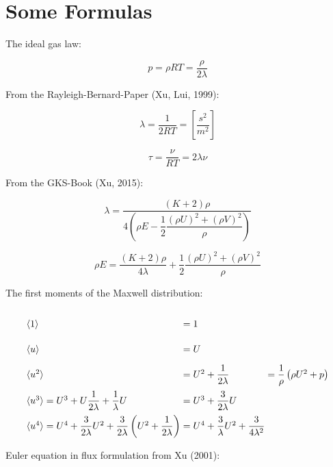 \documentclass[
	pdftex,             %
	12pt,				%
	a4paper,		   	%
	english,				%
	oneside,			%
]{article}
\newcommand{\mom}[1]{\langle #1 \rangle}
\begin{document}
\clearpage

\section{Some Formulas}

The ideal gas law:

\begin{equation}
p = \rho RT = \dfrac{\rho}{2 \lambda}
\end{equation}

From the Rayleigh-Bernard-Paper (Xu, Lui, 1999):

\begin{equation}
\lambda = \frac{1}{2RT} = \left[ \dfrac{s^2}{m^2} \right]
\end{equation}

\begin{equation}
\tau = \frac{\nu}{RT} = 2\lambda\nu
\end{equation}

From the GKS-Book (Xu, 2015):

\begin{equation}
\lambda =\frac{(K+2)\rho}
{4\left( \rho E - \dfrac{1}{2} \dfrac{(\rho U)^2 + (\rho V)^2}{\rho}  \right)}
\end{equation}

\begin{equation}
\rho E = \dfrac{(K+2)\rho}{4\lambda} + \dfrac{1}{2} \dfrac{(\rho U)^2 + (\rho V)^2}{\rho}
\end{equation}

The first moments of the Maxwell distribution:

\begin{equation}
\arraycolsep=1.4pt\def\arraystretch{2.2}
\begin{array}{lcll}
\mom{1} &=& 1 &\\
\mom{u} &=& U &\\
\mom{u^2} &=& U^2 + \dfrac{1}{2\lambda} & = \dfrac{1}{\rho} \left( \rho U^2 + p \right) \\
\mom{u^3} = U^3 + U\dfrac{1}{2\lambda} + \dfrac{1}{\lambda} U &=& U^3 + \dfrac{3}{2\lambda} U &\\
\mom{u^4} = U^4 + \dfrac{3}{2\lambda} U^2 + \dfrac{3}{2\lambda} \left(U^2 + \dfrac{1}{2\lambda} \right)
		  &=& U^4 + \dfrac{3}{\lambda} U^2 + \dfrac{3}{4\lambda^2}&
\end{array}
\end{equation}

Euler equation in flux formulation from Xu (2001):
\end{document}
